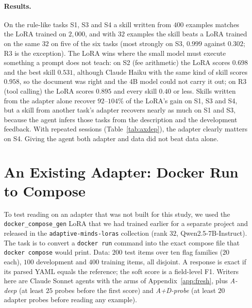 \documentclass[11pt]{article}
\begin{document}
\paragraph{Results.} On the rule-like tasks S1, S3 and S4 a skill written from $400$ examples matches the LoRA trained on $2{,}000$, and with $32$ examples
the skill beats a LoRA trained on the same $32$ on five of the six tasks (most strongly on S3, $0.999$ against $0.302$; R3 is the exception). The LoRA wins where the
small model must execute something a prompt does not teach: on S2 (fee arithmetic) the LoRA scores $0.698$ and the best skill $0.531$, although Claude
Haiku with the same kind of skill scores $0.958$, so the document was right and the 4B model could not carry it out; on R3 (tool calling) the LoRA scores
$0.895$ and every skill $0.40$ or less. Skills written from the adapter alone recover $92$--$104\%$ of the LoRA's gain on S1, S3 and S4, but a skill from
another task's adapter recovers nearly as much on S1 and S3, because the agent infers those tasks from the description and the development feedback. With
repeated sessions (Table~\ref{tab:axdep}), the adapter clearly matters on S4. Giving the agent both adapter and data did not beat data alone.

\section{An Existing Adapter: Docker Run to Compose}
\label{app:dc}

To test reading on an adapter that was not built for this study, we used the \texttt{docker\_compose\_gen} LoRA that we had trained earlier for a
separate project and released in the \texttt{adaptive-minds-loras} collection (rank $32$,
Qwen2.5-7B-Instruct). The task is to convert a \texttt{docker run} command into the exact compose file that \texttt{docker compose} would print. Data:
$200$ test items over ten flag families ($20$ each), $100$ development and $400$ training items, all disjoint. A response is exact if its parsed YAML
equals the reference; the soft score is a field-level F1. Writers here are Claude Sonnet agents with the arms of Appendix~\ref{app:fresh}, plus
\emph{A-deep} (at least $25$ probes before the first score) and \emph{A+D-probe} (at least $20$ adapter probes before reading any example).
\end{document}
